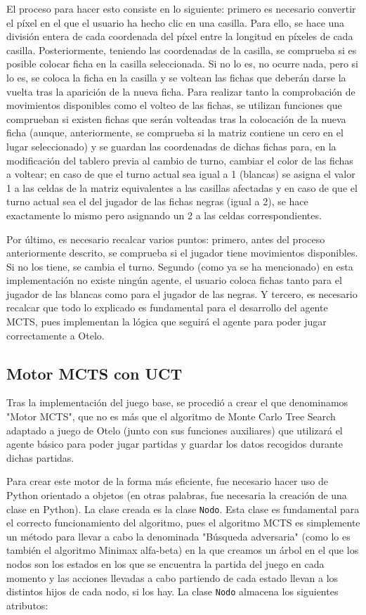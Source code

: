 \documentclass[conference]{IEEEtran}
\begin{document}
El proceso para hacer esto consiste en lo siguiente: primero es necesario convertir el píxel en el que el usuario ha hecho clic en una casilla. Para ello, se hace una división entera de cada coordenada del píxel entre la longitud en píxeles de cada casilla. Posteriormente, teniendo las coordenadas de la casilla, se comprueba si es posible colocar ficha en la casilla seleccionada. Si no lo es, no ocurre nada, pero si lo es, se coloca la ficha en la casilla y se voltean las fichas que deberán darse la vuelta tras la aparición de la nueva ficha. Para realizar tanto la comprobación de movimientos disponibles como el volteo de las fichas, se utilizan funciones que comprueban si existen fichas que serán volteadas tras la colocación de la nueva ficha (aunque, anteriormente, se comprueba si la matriz contiene un cero en el lugar seleccionado) y se guardan las coordenadas de dichas fichas para, en la modificación del tablero previa al cambio de turno, cambiar el color de las fichas a voltear; en caso de que el turno actual sea igual a 1 (blancas) se asigna el valor 1 a las celdas de la matriz equivalentes a las casillas afectadas y en caso de que el turno actual sea el del jugador de las fichas negras (igual a 2), se hace exactamente lo mismo pero asignando un 2 a las celdas correspondientes.

Por último, es necesario recalcar varios puntos: primero, antes del proceso anteriormente descrito, se comprueba si el jugador tiene movimientos disponibles. Si no los tiene, se cambia el turno. Segundo (como ya se ha mencionado) en esta implementación no existe ningún agente, el usuario coloca fichas tanto para el jugador de las blancas como para el jugador de las negras. Y tercero, es necesario recalcar que todo lo explicado es fundamental para el desarrollo del agente MCTS, pues implementan la lógica que seguirá el agente para poder jugar correctamente a Otelo.

\subsection{Motor MCTS con UCT}
Tras la implementación del juego base, se procedió a crear el que denominamos "Motor MCTS", que no es más que el algoritmo de Monte Carlo Tree Search adaptado a juego de Otelo (junto con sus funciones auxiliares) que utilizará el agente básico para poder jugar partidas y guardar los datos recogidos durante dichas partidas.

Para crear este motor de la forma más eficiente, fue necesario hacer uso de Python orientado a objetos (en otras palabras, fue necesaria la creación de una clase en Python). La clase creada es la clase \texttt{Nodo}. Esta clase es fundamental para el correcto funcionamiento del algoritmo, pues el algoritmo MCTS es simplemente un método para llevar a cabo la denominada "Búsqueda adversaria" (como lo es también el algoritmo Minimax alfa-beta) en la que creamos un árbol en el que los nodos son los estados en los que se encuentra la partida del juego en cada momento y las acciones llevadas a cabo partiendo de cada estado llevan a los distintos hijos de cada nodo, si los hay. La clase \texttt{Nodo} almacena los siguientes atributos:
\end{document}
